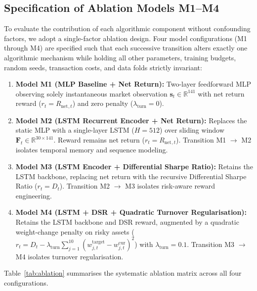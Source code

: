 \documentclass[11pt,a4paper]{article}
\numberwithin{equation}{section}
\numberwithin{table}{section}
\numberwithin{figure}{section}
\numberwithin{algorithm}{section}
\newcommand{\F}{\mathbf{F}}
\newcommand{\bs}{\mathbf{s}}
\newcommand{\Rnet}{R_{\mathrm{net}}}
\begin{document}
\subsection{Specification of Ablation Models M1--M4}
To evaluate the contribution of each algorithmic component without confounding factors, we adopt a single-factor ablation design. Four model configurations (M1 through M4) are specified such that each successive transition alters exactly one algorithmic mechanism while holding all other parameters, training budgets, random seeds, transaction costs, and data folds strictly invariant:
\begin{enumerate}
\item \textbf{Model M1 (MLP Baseline + Net Return):} Two-layer feedforward MLP observing solely instantaneous market observation $\bs_t\in\mathbb{R}^{141}$ with net return reward ($r_t=\Rnet{}_{,t}$) and zero penalty ($\lambda_{\mathrm{turn}}=0$).
\item \textbf{Model M2 (LSTM Recurrent Encoder + Net Return):} Replaces the static MLP with a single-layer LSTM ($H=512$) over sliding window $\F_t\in\mathbb{R}^{30\times141}$. Reward remains net return ($r_t=\Rnet{}_{,t}$). Transition M1 $\to$ M2 isolates temporal memory and sequence modeling.
\item \textbf{Model M3 (LSTM Encoder + Differential Sharpe Ratio):} Retains the LSTM backbone, replacing net return with the recursive Differential Sharpe Ratio ($r_t=D_t$). Transition M2 $\to$ M3 isolates risk-aware reward engineering.
\item \textbf{Model M4 (LSTM + DSR + Quadratic Turnover Regularisation):} Retains the LSTM backbone and DSR reward, augmented by a quadratic weight-change penalty on risky assets ($r_t=D_t-\lambda_{\mathrm{turn}}\sum_{j=1}^{10}(w_{j,t}^{\mathrm{target}}-w_{j,t}^{\mathrm{cur}})^2$) with $\lambda_{\mathrm{turn}}=0.1$. Transition M3 $\to$ M4 isolates turnover regularisation.
\end{enumerate}
Table~\ref{tab:ablation} summarises the systematic ablation matrix across all four configurations.
\end{document}
